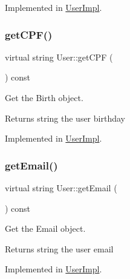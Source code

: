 Implemented in \hyperlink{classUserImpl_aaac79e7ca4bf050cf0c180fb5ec2d751}{User\+Impl}.

\mbox{\label{classUser_a2a23ddf63962cdb3d8cef2054a0a27a0}} 
\subsubsection{\texorpdfstring{get\+C\+P\+F()}{getCPF()}}
{\footnotesize\ttfamily virtual string User\+::get\+C\+PF (\begin{DoxyParamCaption}{ }\end{DoxyParamCaption}) const\hspace{0.3cm}{\ttfamily [pure virtual]}}



Get the Birth object. 

\begin{DoxyReturn}{Returns}
string the user birthday 
\end{DoxyReturn}


Implemented in \hyperlink{classUserImpl_aa20a69738aa1b1ee2e04a6aa65833440}{User\+Impl}.

\mbox{\label{classUser_a58eae5ae9bc079ca5ee31c41326b229e}} 
\subsubsection{\texorpdfstring{get\+Email()}{getEmail()}}
{\footnotesize\ttfamily virtual string User\+::get\+Email (\begin{DoxyParamCaption}{ }\end{DoxyParamCaption}) const\hspace{0.3cm}{\ttfamily [pure virtual]}}



Get the Email object. 

\begin{DoxyReturn}{Returns}
string the user email 
\end{DoxyReturn}


Implemented in \hyperlink{classUserImpl_add6a78d438f5dc401b220c39c7d40a61}{User\+Impl}.

\mbox{\label{classUser_a10b64aca04c37b66fcb5a112e87f97ac}} 
